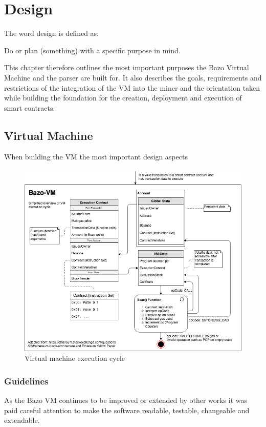 \chapter{Design} \label{design_chapter}
\thispagestyle{main} %
The word design is defined as:

Do or plan (something) with a specific purpose in mind. \cite{design_definition}

This chapter therefore outlines the most important purposes the Bazo Virtual Machine and the parser are built for. It also describes the goals, requirements and restrictions of the integration of the VM into the miner and the orientation taken while building the foundation for the creation, deployment and execution of smart contracts.

\section{Virtual Machine}
When building the VM the most important design aspects

\pagebreak

\begin{figure}[H]
	\begin{center}
	\includegraphics[width=\textwidth]{./images/execution-cycle}
	\caption{Virtual machine execution cycle}
	\label{vmexecutioncycle}
	\end{center}
\end{figure}

\subsection{Guidelines}
As the Bazo VM continues to be improved or extended by other works it was paid careful attention to make the software readable, testable, changeable and extendable. 

